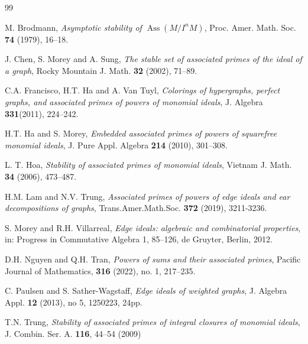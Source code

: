 \documentclass[12pt,amscd]{amsart}
\DeclareMathOperator{\ass}{Ass}
\theoremstyle{definition}
\begin{document}
\begin{thebibliography}{99}

 M. Brodmann, {\it Asymptotic stability of $\ass(M/I^nM)$}, Proc. Amer. Math. Soc. {\bf 74} (1979), 16–18.

 J. Chen, S. Morey and A. Sung, {\it The stable set of associated primes of the ideal of a graph}, Rocky Mountain J. Math. {\bf 32} (2002), 71–89.

 C.A. Francisco, H.T. Ha and A. Van Tuyl, {\it Colorings of hypergraphs, perfect graphs, and associated primes of powers of monomial ideals}, J. Algebra {\bf 331}(2011), 224–242.

 H.T. Ha and S. Morey, {\it Embedded associated primes of powers of squarefree monomial ideals}, J. Pure Appl. Algebra {\bf 214} (2010), 301–308.

 L. T. Hoa, {\it Stability of associated primes of monomial ideals}, Vietnam J. Math. {\bf 34} (2006), 473–487.

 H.M. Lam and N.V. Trung, {\it Associated primes of powers of edge ideals and ear decompositions of graphs}, Trans.Amer.Math.Soc. {\bf 372} (2019), 3211-3236.  

 S. Morey and R.H. Villarreal, {\it Edge ideals: algebraic and combinatorial properties}, in:
Progress in Commutative Algebra 1, 85–126, de Gruyter, Berlin, 2012.


 D.H. Nguyen and Q.H. Tran, {\it Powers of sums and their associated primes}, Pacific Journal of Mathematics, {\bf 316} (2022), no. 1, 217–235.

 C. Paulsen and S. Sather-Wagstaff,  {\it Edge ideals of weighted graphs},  J. Algebra Appl. {\bf 12} (2013), no 5, 1250223, 24pp.



 T.N. Trung, {\it Stability of associated primes of integral closures of monomial ideals},  J. Combin. Ser. A. {\bf 116}, 44–54 (2009)

\end{thebibliography}
\end{document}

